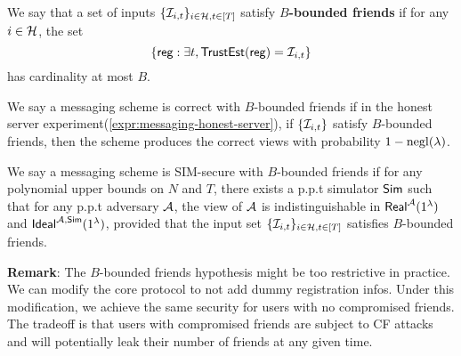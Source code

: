
\begin{definition}
\label{defn:messaging-security-weaker}
We say that a set of inputs $\{\mathcal{I}_{i, t}\}_{i \in \mathcal{H}, t \in [T]}$ satisfy \textbf{$B$-bounded friends} if for any $i \in \mathcal{H}$, the set
$$\{\mathsf{reg}: \exists t, \mathsf{TrustEst}(\mathsf{reg}) = \mathcal{I}_{i, t}\}$$
has cardinality at most $B$.

We say a messaging scheme is correct with $B$-bounded friends if in the honest server experiment(\cref{expr:messaging-honest-server}), if $\{\mathcal{I}_{i, t}\}$ satisfy $B$-bounded friends, then the scheme produces the correct views with probability $1 - \operatorname{negl}(\lambda)$.

We say a messaging scheme is SIM-secure with $B$-bounded friends if for any polynomial upper bounds on $N$ and $T$, there exists a p.p.t simulator $\mathsf{Sim}$ such that for any p.p.t adversary $\mathcal{A}$, the view of $\mathcal{A}$ is indistinguishable in $\mathsf{Real}^{\mathcal{A}}(1^{\lambda})$ and $\mathsf{Ideal}^{\mathcal{A}, \mathsf{\mathsf{Sim}}}(1^{\lambda})$, provided that the input set $\{\mathcal{I}_{i, t}\}_{i \in \mathcal{H}, t \in [T]}$ satisfies $B$-bounded friends.
\end{definition}

\textbf{Remark}: The $B$-bounded friends hypothesis might be too restrictive in practice. We can modify the core protocol to not add dummy registration infos. Under this modification, we achieve the same security for users with no compromised friends. The tradeoff is that users with compromised friends are subject to CF attacks and will potentially leak their number of friends at any given time.